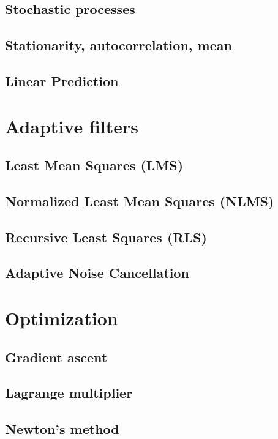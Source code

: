\documentclass{report}
\begin{document}
\subsection{Stochastic processes}
\subsection{Stationarity, autocorrelation, mean}
\subsection{Linear Prediction}

\section{Adaptive filters}

\subsection{Least Mean Squares (LMS)}

\subsection{Normalized Least Mean Squares (NLMS)}

\subsection{Recursive Least Squares (RLS)}

\subsection{Adaptive Noise Cancellation}



\section{Optimization}
\subsection{Gradient ascent}
\subsection{Lagrange multiplier}
\subsection{Newton's method}
\end{document}
